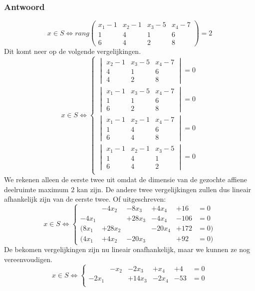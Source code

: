 \documentclass[main.tex]{subfiles}
\begin{document}
\subsubsection{Antwoord}
\[
x \in S \Leftrightarrow
rang
\begin{pmatrix}
  x_{1}-1 & x_{2}-1 & x_{3}-5 & x_{4}-7\\
  1 & 4 & 1 & 6\\
  6 & 4 & 2 & 8
\end{pmatrix}
= 2
\]
Dit komt neer op de volgende vergelijkingen.
\[
x \in S \Leftrightarrow
\left\{
  \begin{array}{c}
    \begin{vmatrix}
      x_{2}-1 & x_{3}-5 & x_{4}-7\\
      4 & 1 & 6\\
      4 & 2 & 8
    \end{vmatrix}
    = 0\\
    \begin{vmatrix}
      x_{1}-1  & x_{3}-5 & x_{4}-7\\
      1 & 1 & 6\\
      6 & 2 & 8
    \end{vmatrix}
    =0\\
    \begin{vmatrix}
      x_{1}-1 & x_{2}-1 & x_{4}-7\\
      1 & 4 & 6\\
      6 & 4 & 8
    \end{vmatrix}
    = 0\\
    \begin{vmatrix}
      x_{1}-1 & x_{2}-1 & x_{3}-5\\
      1 & 4 & 1 \\
      6 & 4 & 2 
    \end{vmatrix}
    = 0\\
  \end{array}
\right.
\]
We rekenen alleen de eerste twee uit omdat de dimensie van de gezochte affiene deelruimte maximum $2$ kan zijn.
De andere twee vergelijkingen zullen dus lineair afhankelijk zijn van de eerste twee.
Of uitgeschreven:
\[
x \in S \Leftrightarrow
\left\{
\begin{array}{cccccc}
          &-4x_{2} &-8x_{3}  &+ 4x_{4} &+16 &= 0\\
  -4x_{1} &        &+28x_{3} &-4x_{4} &-106 &= 0\\
(8x_{1} &+28x_{2} &        &-20x_{4} &+172 &=0)\\
(4x_{1}  &+4x_{2} &- 20x_{3} &        &+92 &=0)
\end{array}
\right.
\]
De bekomen vergelijkingen zijn nu lineair onafhankelijk, maar we kunnen ze nog vereenvoudigen.
\[
x \in S \Leftrightarrow
\left\{
\begin{array}{cccccc}
          &-x_{2} &-2x_{3}  &+ x_{4} &+4 &= 0\\
  -2x_{1} &        &+14x_{3} &-2x_{4} &-53 &= 0\\
\end{array}
\right.
\]
\end{document}
